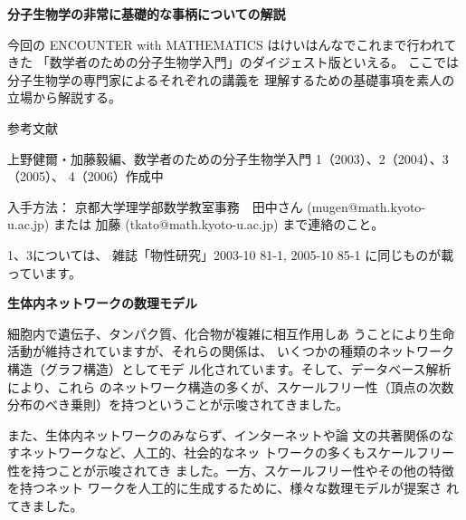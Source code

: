 \documentclass[uplatex,dvipdfmx]{jlreq}
\begin{document}
\begin{center}
{\large\bfseries 分子生物学の非常に基礎的な事柄についての解説}\\[6pt]
\hspace*{\fill}{\large\bfseries 加藤 毅（京都大学 大学院理学研究科・数学教室）}
\end{center}

今回の
ENCOUNTER with MATHEMATICS
はけいはんなでこれまで行われてきた
「数学者のための分子生物学入門」のダイジェスト版といえる。
ここでは分子生物学の専門家によるそれぞれの講義を
理解するための基礎事項を素人の立場から解説する。

\begin{center}\textsc{参考文献}\end{center}

上野健爾・加藤毅編、数学者のための分子生物学入門
1（2003）、2（2004）、3（2005）、
4（2006）作成中

入手方法：
京都大学理学部数学教室事務　田中さん
(mugen@math.kyoto-u.ac.jp)
または
加藤
(tkato@math.kyoto-u.ac.jp)
まで連絡のこと。

1、3については、
雑誌「物性研究」2003-10 81-1, 2005-10 85-1
に同じものが載っています。

\vfill

\newpage

\begin{center}
{\large\bfseries 生体内ネットワークの数理モデル}\\[6pt]
\hspace*{\fill}{\large\bfseries 阿久津 達也（京都大学・化学研究所・バイオインフォマティクスセンター）}
\end{center}

細胞内で遺伝子、タンパク質、化合物が複雑に相互作用しあ
うことにより生命活動が維持されていますが、それらの関係は、
いくつかの種類のネットワーク構造（グラフ構造）としてモデ
ル化されています。そして、データベース解析により、これら
のネットワーク構造の多くが、スケールフリー性（頂点の次数
分布のべき乗則）を持つということが示唆されてきました。

また、生体内ネットワークのみならず、インターネットや論
文の共著関係のなすネットワークなど、人工的、社会的なネッ
トワークの多くもスケールフリー性を持つことが示唆されてき
ました。一方、スケールフリー性やその他の特徴を持つネット
ワークを人工的に生成するために、様々な数理モデルが提案さ
れてきました。
\end{document}
